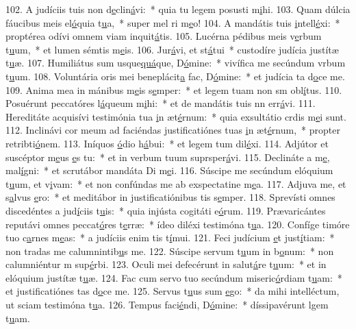 102. A judíciis tuis non d\uline{e}clin\uline{á}vi:~* quia tu legem posusti m\uline{i}hi.
103. Quam dúlcia fáucibus meis el\uline{ó}quia t\uline{u}a,~* super mel ri m\uline{e}o!
104. A mandátis tuis \uline{i}ntell\uline{é}xi:~* proptérea odívi omnem viam inquit\uline{á}tis.
105. Lucérna pédibus meis v\uline{e}rbum t\uline{u}um,~* et lumen sémtis m\uline{e}is.
106. Jur\uline{á}vi, et st\uline{á}tui~* custodíre judícia justítæ t\uline{u}æ.
107. Humiliátus sum usque\uline{quá}que, D\uline{ó}mine:~* vivífica me secúndum vrbum t\uline{u}um.
108. Voluntária oris mei beneplácit\uline{a} fac, D\uline{ó}mine:~* et judícia ta d\uline{o}ce me.
109. Anima mea in mánibus m\uline{e}is s\uline{e}mper:~* et legem tuam non sm obl\uline{í}tus.
110. Posuérunt peccatóres l\uline{á}queum m\uline{i}hi:~* et de mandátis tuis nn err\uline{á}vi.
111. Hereditáte acquisívi testimónia tua \uline{i}n æt\uline{é}rnum:~* quia exsultátio crdis m\uline{e}i sunt.
112. Inclinávi cor meum ad faciéndas justificatiónes tuas \uline{i}n æt\uline{é}rnum,~* propter retribti\uline{ó}nem.
113. Iníquos \uline{ó}dio h\uline{á}bui:~* et legem tum dil\uline{é}xi.
114. Adjútor et suscéptor m\uline{e}us \uline{e}s tu:~* et in verbum tuum suprsper\uline{á}vi.
115. Declináte a m\uline{e}, mal\uline{í}gni:~* et scrutábor mandáta Di m\uline{e}i.
116. Súscipe me secúndum elóquium t\uline{u}um, et v\uline{i}vam:~* et non confúndas me ab exspectatine m\uline{e}a.
117. Adjuva me, et s\uline{a}lvus \uline{e}ro:~* et meditábor in justificatiónibus tis s\uline{e}mper.
118. Sprevísti omnes discedéntes a jud\uline{í}ciis t\uline{u}is:~* quia injústa cogitáti e\uline{ó}rum.
119. Prævaricántes reputávi omnes peccat\uline{ó}res t\uline{e}rræ:~* ídeo diléxi testimóna t\uline{u}a.
120. Confíge timóre tuo c\uline{a}rnes m\uline{e}as:~* a judíciis enim tis t\uline{í}mui.
121. Feci judícium \uline{e}t just\uline{í}tiam:~* non tradas me calumnintib\uline{u}s me.
122. Súscipe servum t\uline{u}um in b\uline{o}num:~* non calumniéntur m sup\uline{é}rbi.
123. Oculi mei defecérunt in salut\uline{á}re t\uline{u}um:~* et in elóquium justítæ t\uline{u}æ.
124. Fac cum servo tuo secúndum miseric\uline{ó}rdiam t\uline{u}am:~* et justificatiónes tas d\uline{o}ce me.
125. Servus t\uline{u}us sum \uline{e}go:~* da mihi intelléctum, ut sciam testimóna t\uline{u}a.
126. Tempus faci\uline{é}ndi, D\uline{ó}mine:~* díssipavérunt lgem t\uline{u}am.
